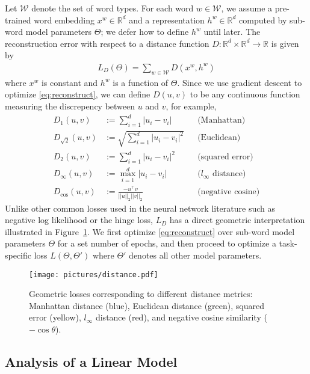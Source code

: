 \documentclass[11pt,letterpaper,UTF8]{article}
\newcommand{\R}{\ensuremath{\mathbb{R}}}
\newcommand{\ra}{\ensuremath{\rightarrow}}
\newcommand{\paren}[1]{\left(#1\right)}
\newcommand{\abs}[1]{\left|#1\right|}
\newcommand{\by}{\ensuremath{\times}}
\newcommand{\norm}[1]{\left|\left|#1\right|\right|}
\begin{document}
\begin{CJK}{UTF8}{gbsn}
Let $\mathcal{W}$ denote the set of word types.
For each word $w \in \mathcal{W}$, we assume a pre-trained word embedding $x^w \in \R^d$
and a representation $h^w \in \R^d$ computed by sub-word model parameters $\Theta$; we defer how to define $h^w$ until later.
The reconstruction error with respect to a distance function $D:\R^d \by \R^d \ra \R$ is given by
\begin{align}
L_D\paren{\Theta} = \sum_{w \in \mathcal{W}} D\paren{x^w, h^w}  \label{eq:reconstruct}
\end{align}
where $x^w$ is constant and $h^w$ is a function of $\Theta$.
Since we use gradient descent to optimize \eqref{eq:reconstruct}, we can define
$D(u, v)$ to be any continuous function measuring the discrepency between $u$ and $v$, for example,
\begin{align*}
D_1(u, v) &:= \sum_{i = 1}^d \abs{u_i - v_i} && \mbox{(Manhattan)} \\
D_{\sqrt{2}}(u, v) &:= \sqrt{\sum_{i = 1}^d \abs{u_i - v_i}^2} && \mbox{(Euclidean)} \\
D_2(u, v) &:= \sum_{i = 1}^d \abs{u_i - v_i}^2 && \mbox{(squared error)} \\
D_\infty(u, v) &:= \max_{i = 1}^d \abs{u_i - v_i} && \mbox{($l_\infty$ distance)} \\
D_{\cos{}}(u, v) &:= \frac{- u^\top v}{\norm{u}_2 \norm{v}_2} && \mbox{(negative cosine)}
\end{align*}
Unlike other common losses used in the neural network literature such as negative log likelihood or the hinge loss,
$L_D$ has a direct geometric interpretation illustrated in Figure~\ref{fig:distance}.
We first optimize \eqref{eq:reconstruct} over sub-word model parameters $\Theta$ for a set number of epochs,
and then proceed to optimize a task-specific loss $L(\Theta, \Theta')$ where $\Theta'$ denotes all other model parameters.

\begin{figure}[t!]
\begin{center}
\texttt{[image: pictures/distance.pdf]}
\caption{Geometric losses corresponding to different distance metrics:
Manhattan distance (blue), Euclidean distance (green), squared error (yellow),
$l_\infty$ distance (red), and negative cosine similarity ($-\cos \theta$).
}
\label{fig:distance}
\end{center}
\end{figure}


\subsection{Analysis of a Linear Model}


\end{CJK}
\end{document}
